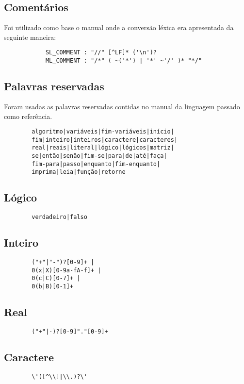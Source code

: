 \documentclass[a4paper,10pt]{article}
\begin{document}
	\subsection{Comentários}
		Foi utilizado como base o manual onde a conversão léxica era apresentada da seguinte maneira:
		\begin{verbatim}
			SL_COMMENT : "//" [^LF]* ('\n')?
			ML_COMMENT : "/*" ( ~('*') | '*' ~'/' )* "*/"
		\end{verbatim}

	\subsection{Palavras reservadas}
		Foram usadas as palavras reservadas contidas no manual da linguagem
		passado como referência.
		\begin{verbatim}
		algoritmo|variáveis|fim-variáveis|início|
		fim|inteiro|inteiros|caractere|caracteres|
		real|reais|literal|lógico|lógicos|matriz|
		se|então|senão|fim-se|para|de|até|faça|
		fim-para|passo|enquanto|fim-enquanto|
		imprima|leia|função|retorne
		\end{verbatim}

	\subsection{Lógico}
		\begin{verbatim}
		verdadeiro|falso
		\end{verbatim}

	\subsection{Inteiro}
		\begin{verbatim}
		("+"|"-")?[0-9]+ |
		0(x|X)[0-9a-fA-f]+ |
		0(c|C)[0-7]+ |
		0(b|B)[0-1]+
		\end{verbatim}

	\subsection{Real}
		\begin{verbatim}
		("+"|-)?[0-9]"."[0-9]+
		\end{verbatim}

	\subsection{Caractere}
		\begin{verbatim}
		\'([^\\]|\\.)?\'
		\end{verbatim}
\end{document}
